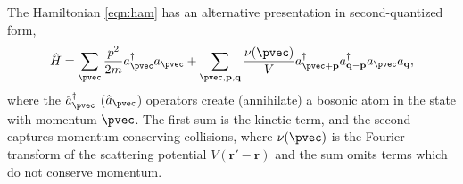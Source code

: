	The Hamiltonian \ref{eqn:ham} has an alternative presentation in second-quantized form,
	\begin{equation}
		\hat{H} = \sum_\pvec \frac{p^2}{2m} a^\dagger_\pvec a_\pvec +\sum_{\pvec,\textbf{p},\textbf{q}} \frac{\nu(\pvec)}{V}a^\dagger_{\pvec+\textbf{p}} a^\dagger_{\textbf{q}-\textbf{p}} a_\pvec a_\textbf{q}, 
	\end{equation}
	where the $\hat{a}^\dagger_\pvec$  ($\hat{a}_\pvec$) operators create (annihilate) a bosonic atom in the state with momentum $\pvec$. The first sum is the kinetic term, and the second captures momentum-conserving collisions, where $\nu(\pvec)$ is the Fourier transform of the scattering potential $V(\textbf{r}'-\textbf{r})$ and the sum omits terms which do not conserve momentum. 


